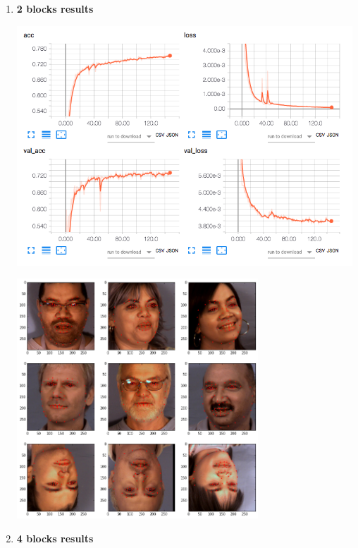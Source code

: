 \documentclass[11pt]{article}
\begin{document}
\begin{enumerate}
\pagebreak

\begin{enumerate}
\item \textbf{2 blocks results}
\label{sec:org395fcaa}

\centerline{\includegraphics[height=9cm]{./images/incep249Loss.png}}
\centerline{\includegraphics[height=9cm]{./images/incep249res.png}}

\pagebreak

\item \textbf{4 blocks results}
\label{sec:org6e232b6}


\end{enumerate}
\end{enumerate}
\end{document}
